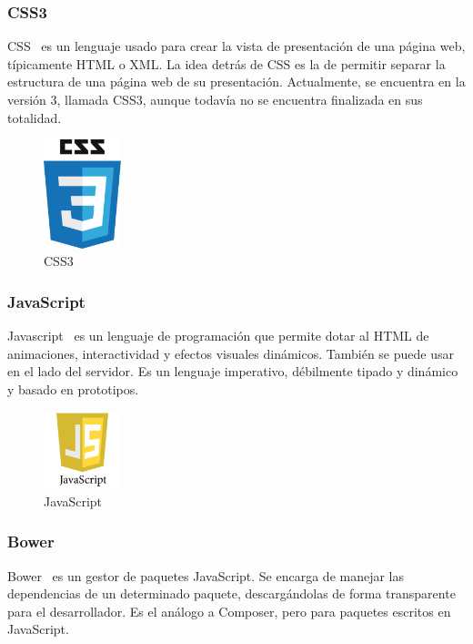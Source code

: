 \subsubsection*{CSS3}
CSS~\cite{css3} es un lenguaje usado para crear la vista de presentación de una página web, típicamente HTML o XML. La idea detrás de CSS es la de permitir separar la estructura de una página web de su presentación. Actualmente, se encuentra en la versión 3, llamada CSS3, aunque todavía no se encuentra finalizada en sus totalidad.

\begin{figure}[tbh]
\centering
\label{fig:css3}
\includegraphics[width=0.2\textwidth]{imagenes/css3}
\caption{CSS3}
\end{figure}

\subsubsection*{JavaScript}
Javascript~\cite{javascript} es un lenguaje de programación que permite dotar al HTML de animaciones, interactividad y efectos visuales dinámicos. También se puede usar en el lado del servidor. Es un lenguaje imperativo, débilmente tipado y dinámico y basado en prototipos.

\begin{figure}[tbh]
\centering
\label{fig:javascript}
\includegraphics[width=0.2\textwidth]{imagenes/javascript}
\caption{JavaScript}
\end{figure}

\subsubsection*{Bower}
Bower~\cite{bower} es un gestor de paquetes JavaScript. Se encarga de manejar las dependencias de un determinado paquete, descargándolas de forma transparente para el desarrollador. Es el análogo a Composer, pero para paquetes escritos en JavaScript. 

